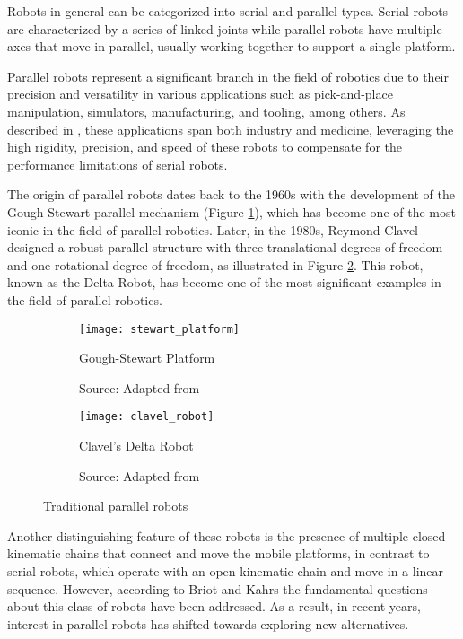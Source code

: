 \par Robots in general can be categorized into serial and parallel types. Serial robots are characterized by a series of linked joints while parallel robots have multiple axes that move in parallel, usually working together to support a single platform.

\par Parallel robots represent a significant branch in the field of robotics due to their precision and versatility in various applications such as pick-and-place manipulation, simulators, manufacturing, and tooling, among others. As described in \cite{shao2024}, these applications span both industry and medicine, leveraging the high rigidity, precision, and speed of these robots to compensate for the performance limitations of serial robots.

\par The origin of parallel robots dates back to the 1960s with the development of the Gough-Stewart \cite{stewart1965} parallel mechanism (Figure \ref{fig:stewart_platform}), which has become one of the most iconic in the field of parallel robotics. Later, in the 1980s, Reymond Clavel designed a robust parallel structure with three translational degrees of freedom and one rotational degree of freedom, as illustrated in Figure \ref{fig:delta_robot}. This robot, known as the Delta Robot, has become one of the most significant examples in the field of parallel robotics. 

\begin{figure}
    \centering
    \begin{subfigure}[t]{0.45\textwidth}
        \texttt{[image: stewart\_platform]}
        \caption{Gough-Stewart Platform}
        \caption*{Source: Adapted from \cite{stewart1965}}
        \label{fig:stewart_platform}
    \end{subfigure}
    \begin{subfigure}[t]{0.45\textwidth}
        \texttt{[image: clavel\_robot]}
        \caption{Clavel's Delta Robot}
        \caption*{Source: Adapted from \cite{sandyEFPL}}
        \label{fig:delta_robot}
    \end{subfigure}
    \caption{Traditional parallel robots}
    \label{fig:traditionals}
\end{figure}

\par Another distinguishing feature of these robots is the presence of multiple closed kinematic chains that connect and move the mobile platforms, in contrast to serial robots, which operate with an open kinematic chain and move in a linear sequence. However, according to Briot and Kahrs\cite{briot2023} the fundamental questions about this class of robots have been addressed. As a result, in recent years, interest in parallel robots has shifted towards exploring new alternatives.

